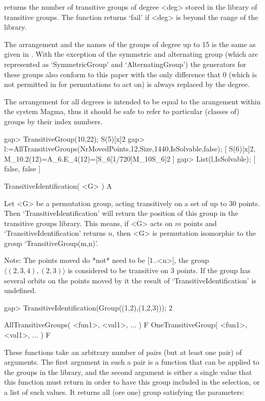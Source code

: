 returns the number of transitive groups of degree <deg> stored in the
library of transitive groups. The function returns `fail' if <deg> is
beyond the range of the library.

The arrangement and the names of the groups of degree up to 15 is the same
as given in \cite{ConwayHulpkeMcKay98}. With the exception of the symmetric
and alternating group (which are represented as `SymmetricGroup' and
`AlternatingGroup') the generators for these groups also conform to this
paper with the only difference that 0 (which is not permitted in {\GAP} for
permutations to act on) is always replaced by the degree.

The arrangement for all degrees is intended to be equal to the arangement
within the system Magma, thus it should be safe to refer to particular
(classes of) groups by their index numbers.

\beginexample
gap> TransitiveGroup(10,22);
S(5)[x]2
gap> l:=AllTransitiveGroups(NrMovedPoints,12,Size,1440,IsSolvable,false);
[ S(6)[x]2, M_10.2(12)=A_6.E_4(12)=[S_6[1/720]{M_10}S_6]2 ]
gap> List(l,IsSolvable);
[ false, false ]
\endexample

\>TransitiveIdentification( <G> ) A

Let <G> be a permutation group, acting transitively on a set  of up to 30
points.  Then `TransitiveIdentification' will return the position of this
group in the transitive  groups library.  This means,  if <G> acts on
$m$ points and    `TransitiveIdentification'  returns $n$,  then <G>   is
permutation isomorphic to the group `TransitiveGroup(m,n)'.

Note: The points moved do *not* need to be [1..<n>], the group
$\langle (2,3,4),(2,3)\rangle$ is considered to be transitive on 3
points. If the group has several orbits on the points moved by it the
result of `TransitiveIdentification' is undefined.


\beginexample
gap> TransitiveIdentification(Group((1,2),(1,2,3)));
2
\endexample


\>AllTransitiveGroups( <fun1>, <val1>, ... ) F
\>OneTransitiveGroup( <fun1>, <val1>, ... ) F

These functions take an arbitrary number of pairs (but at least one pair)
of arguments. The first argument in such a pair is a function that can be
applied to the groups in the library, and the second argument is either a
single value that this function must return in order to have  this  group
included in the selection, or a list of such  values. 
It returns all (ore one) group satisfying the parameters:

